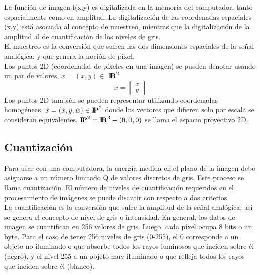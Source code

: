 La función de imagen f(x,y) es digitalizada en la memoria del computador, tanto
espacialmente como en amplitud. La digitalización de las coordenadas espaciales (x,y)
está asociada al concepto de muestreo, mientras que la digitalización de la amplitud al
de cuantificación de los niveles de gris.\cite{Book:Jose2005}
\\El muestreo es la conversión que sufren las dos dimensiones espaciales de la
señal analógica, y que genera la noción de píxel.\\
Los puntos 2D (coordenadas de píxeles en una imagen) se pueden denotar usando un par de valores, $x = (x,y) \in$ ${\textbf{I\!R}^2}$\cite{Book:Richard2011}
\begin{equation}
	x = \left[
		\begin{array}{c}
			x \\
			y
		\end{array}
		\right]
\end{equation}
Los puntos 2D también se pueden representar utilizando coordenadas homogéneas, $\tilde{x} = (\tilde{x},\tilde{y}, \tilde{w}) \in {\textbf{I\!P}^2}$
donde los vectores que difieren solo por escala se consideran equivalentes. ${\textbf{I\!P}^2} = {\textbf{I\!R}^3} -  (0,0,0) $ se llama el espacio proyectivo 2D.


\subsection{Cuantización}
Para usar con una computadora, la energía medida en el plano de la imagen debe
asignarse a un número limitado Q de valores discretos de gris. Este proceso se llama
cuantización. El número de niveles de cuantificación requeridos en el procesamiento de
imágenes se puede discutir con respecto a dos criterios.\cite{Book:Richard2011}\\
La cuantificación es la conversión
que sufre la amplitud de la señal analógica; así se genera el concepto de nivel de gris o
intensidad. En general, los datos de imagen se cuantifican en 256 valores de gris.
Luego, cada píxel ocupa 8 bits o un byte. Para el caso de tener 256 niveles de gris (0-255), el 0 corresponde a un
objeto no iluminado o que absorbe todos los rayos luminosos que inciden sobre él
(negro), y el nivel 255 a un objeto muy iluminado o que refleja todos los rayos que
inciden sobre él (blanco).

